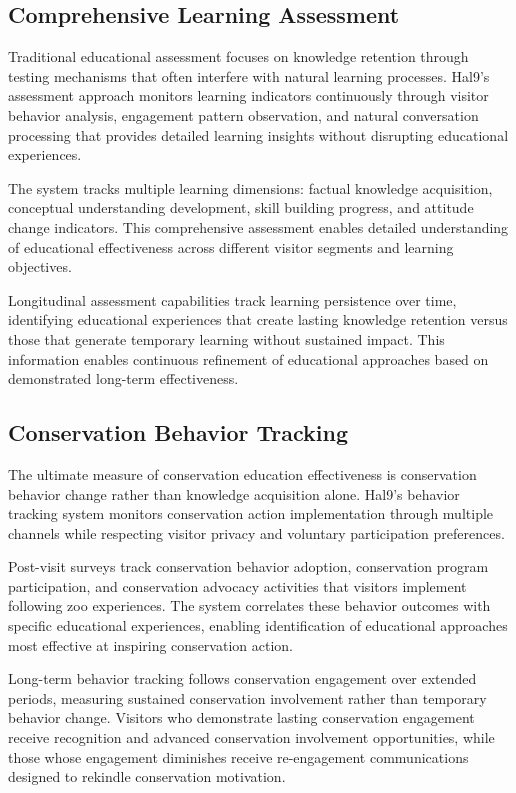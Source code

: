 \documentclass[
  Letterpaper,
]{scrbook}
\begin{document}
\subsection{Comprehensive Learning
Assessment}\label{comprehensive-learning-assessment}

Traditional educational assessment focuses on knowledge retention
through testing mechanisms that often interfere with natural learning
processes. Hal9's assessment approach monitors learning indicators
continuously through visitor behavior analysis, engagement pattern
observation, and natural conversation processing that provides detailed
learning insights without disrupting educational experiences.

The system tracks multiple learning dimensions: factual knowledge
acquisition, conceptual understanding development, skill building
progress, and attitude change indicators. This comprehensive assessment
enables detailed understanding of educational effectiveness across
different visitor segments and learning objectives.

Longitudinal assessment capabilities track learning persistence over
time, identifying educational experiences that create lasting knowledge
retention versus those that generate temporary learning without
sustained impact. This information enables continuous refinement of
educational approaches based on demonstrated long-term effectiveness.

\subsection{Conservation Behavior
Tracking}\label{conservation-behavior-tracking}

The ultimate measure of conservation education effectiveness is
conservation behavior change rather than knowledge acquisition alone.
Hal9's behavior tracking system monitors conservation action
implementation through multiple channels while respecting visitor
privacy and voluntary participation preferences.

Post-visit surveys track conservation behavior adoption, conservation
program participation, and conservation advocacy activities that
visitors implement following zoo experiences. The system correlates
these behavior outcomes with specific educational experiences, enabling
identification of educational approaches most effective at inspiring
conservation action.

Long-term behavior tracking follows conservation engagement over
extended periods, measuring sustained conservation involvement rather
than temporary behavior change. Visitors who demonstrate lasting
conservation engagement receive recognition and advanced conservation
involvement opportunities, while those whose engagement diminishes
receive re-engagement communications designed to rekindle conservation
motivation.
\end{document}
